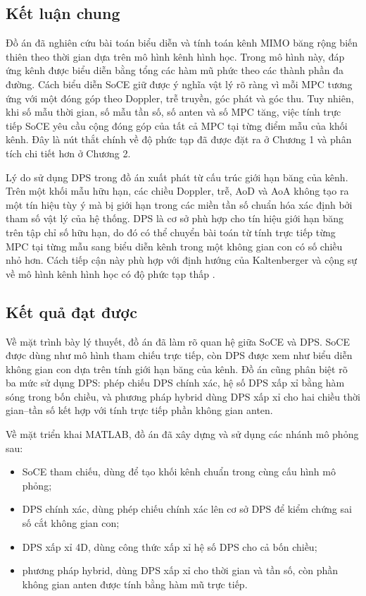 \setcounter{section}{5}
\label{chap:conclusion_future}

\subsection{Kết luận chung}
\label{subsec:ch5_general_conclusion}

Đồ án đã nghiên cứu bài toán biểu diễn và tính toán kênh MIMO băng rộng biến thiên theo thời gian dựa trên mô hình kênh hình học. Trong mô hình này, đáp ứng kênh được biểu diễn bằng tổng các hàm mũ phức theo các thành phần đa đường. Cách biểu diễn SoCE giữ được ý nghĩa vật lý rõ ràng vì mỗi MPC tương ứng với một đóng góp theo Doppler, trễ truyền, góc phát và góc thu. Tuy nhiên, khi số mẫu thời gian, số mẫu tần số, số anten và số MPC tăng, việc tính trực tiếp SoCE yêu cầu cộng đóng góp của tất cả MPC tại từng điểm mẫu của khối kênh. Đây là nút thắt chính về độ phức tạp đã được đặt ra ở Chương 1 và phân tích chi tiết hơn ở Chương 2.

Lý do sử dụng DPS trong đồ án xuất phát từ cấu trúc giới hạn băng của kênh. Trên một khối mẫu hữu hạn, các chiều Doppler, trễ, AoD và AoA không tạo ra một tín hiệu tùy ý mà bị giới hạn trong các miền tần số chuẩn hóa xác định bởi tham số vật lý của hệ thống. DPS là cơ sở phù hợp cho tín hiệu giới hạn băng trên tập chỉ số hữu hạn, do đó có thể chuyển bài toán từ tính trực tiếp từng MPC tại từng mẫu sang biểu diễn kênh trong một không gian con có số chiều nhỏ hơn. Cách tiếp cận này phù hợp với định hướng của Kaltenberger và cộng sự về mô hình kênh hình học có độ phức tạp thấp \cite{Kaltenberger2007}.

\subsection{Kết quả đạt được}
\label{subsec:ch5_obtained_results}

Về mặt trình bày lý thuyết, đồ án đã làm rõ quan hệ giữa SoCE và DPS. SoCE được dùng như mô hình tham chiếu trực tiếp, còn DPS được xem như biểu diễn không gian con dựa trên tính giới hạn băng của kênh. Đồ án cũng phân biệt rõ ba mức sử dụng DPS: phép chiếu DPS chính xác, hệ số DPS xấp xỉ bằng hàm sóng trong bốn chiều, và phương pháp hybrid dùng DPS xấp xỉ cho hai chiều thời gian--tần số kết hợp với tính trực tiếp phần không gian anten.

Về mặt triển khai MATLAB, đồ án đã xây dựng và sử dụng các nhánh mô phỏng sau:
\begin{itemize}
    \item SoCE tham chiếu, dùng để tạo khối kênh chuẩn trong cùng cấu hình mô phỏng;
    \item DPS chính xác, dùng phép chiếu chính xác lên cơ sở DPS để kiểm chứng sai số cắt không gian con;
    \item DPS xấp xỉ 4D, dùng công thức xấp xỉ hệ số DPS cho cả bốn chiều;
    \item phương pháp hybrid, dùng DPS xấp xỉ cho thời gian và tần số, còn phần không gian anten được tính bằng hàm mũ trực tiếp.
\end{itemize}

